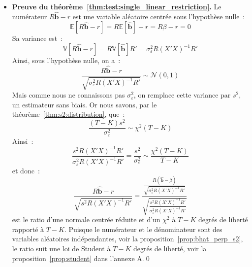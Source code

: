 \documentclass[10pt,a4paper]{article}
\theoremstyle{definition}
\begin{document}
\begin{notes}

  \begin{itemize}

  \item \textbf{Preuve du théorème~\ref{thm:test:single_linear_restriction}.} Le numérateur $R\hat{\mathbf b}-r$ est une variable aléatoire centrée sous l'hypothèse nulle~:
    \[
      \mathbb E \left[ R\hat{\mathbf b} - r \right] = R\mathbb E\left[ \hat{\mathbf b} \right] - r = R\beta-r = 0
    \]
    Sa variance est~:
    \[
      \mathbb V\left[ R\hat{\mathbf b}-r\right] = R\mathbb V\left[ \hat{\mathbf b} \right] R' = \sigma_{\varepsilon}^2R(X'X)^{-1}R'
    \]
    Ainsi, sous l'hypothèse nulle, on a~:
    \[
      \frac{R\hat{\mathbf b}-r}{\sqrt{\sigma_{\varepsilon}^2R(X'X)^{-1}R'}} \sim \mathcal N(0,1)
    \]
    Mais comme nous ne connaissons pas $\sigma_{\varepsilon}^2$, on remplace cette variance par $s^2$, un estimateur sans biais. Or nous savons, par le théorème~\ref{thm:s2:distribution}, que~:
    \[
      \frac{(T-K)s^2}{\sigma_{\varepsilon}^2} \sim \chi^2(T-K)
    \]
    Ainsi~:
    \[
      \frac{s^2R(X'X)^{-1}R'}{\sigma_{\varepsilon}^2R(X'X)^{-1}R'} = \frac{s^2}{\sigma_{\varepsilon}^2} \sim \frac{\chi^2(T-K)}{T-K}
    \]
    et donc~:
    \[
      \frac{R\hat{\mathbf b}-r}{\sqrt{s^2R(X'X)^{-1}R'}} =
      \frac{\frac{R\left( \hat{\mathbf b} - \beta \right)}{\sqrt{\sigma_{\varepsilon}^2R(X'X)^{-1}R'}}}
      {\sqrt{\frac{s^2R(X'X)^{-1}R'}{\sigma_{\varepsilon}^2R(X'X)^{-1}R'}}}
    \]
    est le ratio d'une normale centrée réduite et d'un $\chi^2$ à $T-K$ degrés de liberté rapporté à $T-K$. Puisque le numérateur et le dénominateur sont des variables aléatoires indépendantes, voir la proposition~\ref{prop:bhat_perp_s2}, le ratio suit une loi de Student à $T-K$ degrés de liberté, voir la proposition~\ref{prop:student} dans l'annexe A.\qed

  \end{itemize}

\end{notes}
\end{document}

